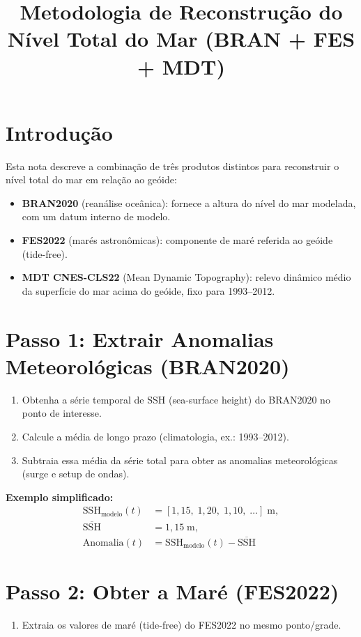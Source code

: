 \documentclass[a4paper,12pt]{article}
\begin{document}
\title{Metodologia de Reconstrução do Nível Total do Mar (BRAN + FES + MDT)}
\author{}
\date{}
\maketitle

\section{Introdução}
Esta nota descreve a combinação de três produtos distintos para reconstruir o nível total do mar em relação ao geóide:
\begin{itemize}
  \item \textbf{BRAN2020} (reanálise oceânica): fornece a altura do nível do mar modelada, com um datum interno de modelo.
  \item \textbf{FES2022} (marés astronômicas): componente de maré referida ao geóide (tide-free).
  \item \textbf{MDT CNES-CLS22} (Mean Dynamic Topography): relevo dinâmico médio da superfície do mar acima do geóide, fixo para 1993--2012.
\end{itemize}

\section{Passo 1: Extrair Anomalias Meteorológicas (BRAN2020)}
\begin{enumerate}
  \item Obtenha a série temporal de SSH (sea-surface height) do BRAN2020 no ponto de interesse.
  \item Calcule a média de longo prazo (climatologia, ex.: 1993--2012).
  \item Subtraia essa média da série total para obter as anomalias meteorológicas (surge e setup de ondas).
\end{enumerate}

\textbf{Exemplo simplificado:}
\begin{align*}
\text{SSH}_{\text{modelo}}(t) &= [1{,}15,\; 1{,}20,\; 1{,}10,\;\dots]\;\mathrm{m},\\
\overline{\text{SSH}} &= 1{,}15\;\mathrm{m},\\
\text{Anomalia}(t) &= \text{SSH}_{\text{modelo}}(t) - \overline{\text{SSH}}
\end{align*}

\section{Passo 2: Obter a Maré (FES2022)}
\begin{enumerate}
  \item Extraia os valores de maré (tide-free) do FES2022 no mesmo ponto/grade.
\end{enumerate}
\end{document}
